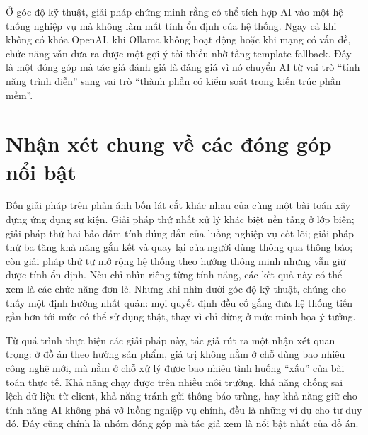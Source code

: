 \documentclass[../DoAn.tex]{subfiles}
\begin{document}
Ở góc độ kỹ thuật, giải pháp chứng minh rằng có thể tích hợp AI vào một hệ thống nghiệp vụ mà không làm mất tính ổn định của hệ thống. Ngay cả khi không có khóa OpenAI, khi Ollama không hoạt động hoặc khi mạng có vấn đề, chức năng vẫn đưa ra được một gợi ý tối thiểu nhờ tầng template fallback. Đây là một đóng góp mà tác giả đánh giá là đáng giá vì nó chuyển AI từ vai trò “tính năng trình diễn” sang vai trò “thành phần có kiểm soát trong kiến trúc phần mềm”.

\section{Nhận xét chung về các đóng góp nổi bật}
Bốn giải pháp trên phản ánh bốn lát cắt khác nhau của cùng một bài toán xây dựng ứng dụng sự kiện. Giải pháp thứ nhất xử lý khác biệt nền tảng ở lớp biên; giải pháp thứ hai bảo đảm tính đúng đắn của luồng nghiệp vụ cốt lõi; giải pháp thứ ba tăng khả năng gắn kết và quay lại của người dùng thông qua thông báo; còn giải pháp thứ tư mở rộng hệ thống theo hướng thông minh nhưng vẫn giữ được tính ổn định. Nếu chỉ nhìn riêng từng tính năng, các kết quả này có thể xem là các chức năng đơn lẻ. Nhưng khi nhìn dưới góc độ kỹ thuật, chúng cho thấy một định hướng nhất quán: mọi quyết định đều cố gắng đưa hệ thống tiến gần hơn tới mức có thể sử dụng thật, thay vì chỉ dừng ở mức minh họa ý tưởng.

Từ quá trình thực hiện các giải pháp này, tác giả rút ra một nhận xét quan trọng: ở đồ án theo hướng sản phẩm, giá trị không nằm ở chỗ dùng bao nhiêu công nghệ mới, mà nằm ở chỗ xử lý được bao nhiêu tình huống “xấu” của bài toán thực tế. Khả năng chạy được trên nhiều môi trường, khả năng chống sai lệch dữ liệu từ client, khả năng tránh gửi thông báo trùng, hay khả năng giữ cho tính năng AI không phá vỡ luồng nghiệp vụ chính, đều là những ví dụ cho tư duy đó. Đây cũng chính là nhóm đóng góp mà tác giả xem là nổi bật nhất của đồ án.
\end{document}
